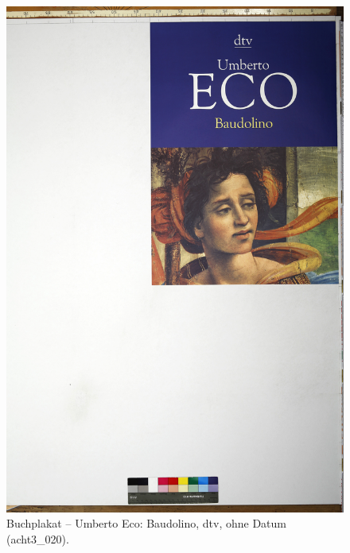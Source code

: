 \documentclass[a4paper,12pt,ngerman]{article}
\begin{document}
\newpage
\begin{figure}[ht]
\includegraphics[width=\linewidth]{Abbildung_12_(acht3_020)}
\centering
\caption{Buchplakat – Umberto Eco: Baudolino, dtv, ohne Datum (acht3\_020).}
\end{figure}
\end{document}
